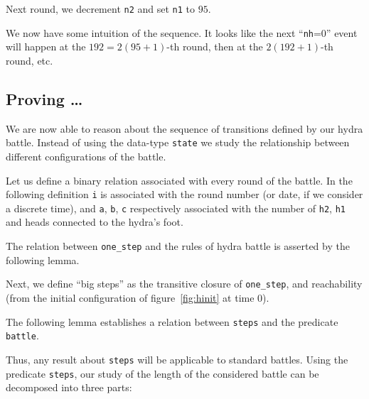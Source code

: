 Next round, we decrement \texttt{n2} and set \texttt{n1} to $95$.





We now have some intuition of the sequence.
It looks like the next ``\texttt{nh}=0'' event will happen at the $192=2(95+1)$-th round, then at the $2(192+1)$-th round, etc.




\subsection{Proving \dots}
We are now able to reason about the sequence of transitions defined by our hydra battle. Instead of using the data-type \texttt{state} we study the relationship
between different configurations of the battle.

Let us define a binary relation associated with every round of the battle.
In the following definition \texttt{i} is associated with the round number (or date, if we consider a discrete time), and \texttt{a}, \texttt{b}, \texttt{c} respectively associated with the number of \texttt{h2}, \texttt{h1} and heads connected to the hydra's foot.



The relation between \texttt{one\_step} and the rules of hydra battle is asserted by the following lemma. 

\label{lemma:step-battle}



\vspace{4pt}

Next, we define ``big steps'' as the transitive closure of \texttt{one\_step},
and reachability (from the initial configuration of figure~\ref{fig:hinit} at time $0$).






The following lemma establishes a relation between \texttt{steps} and the predicate \texttt{battle}.



\vspace{4pt}

Thus, any result about \texttt{steps} will be applicable to standard battles.
Using the predicate \texttt{steps},  our study of the length of the considered battle
can  be decomposed into three parts:

